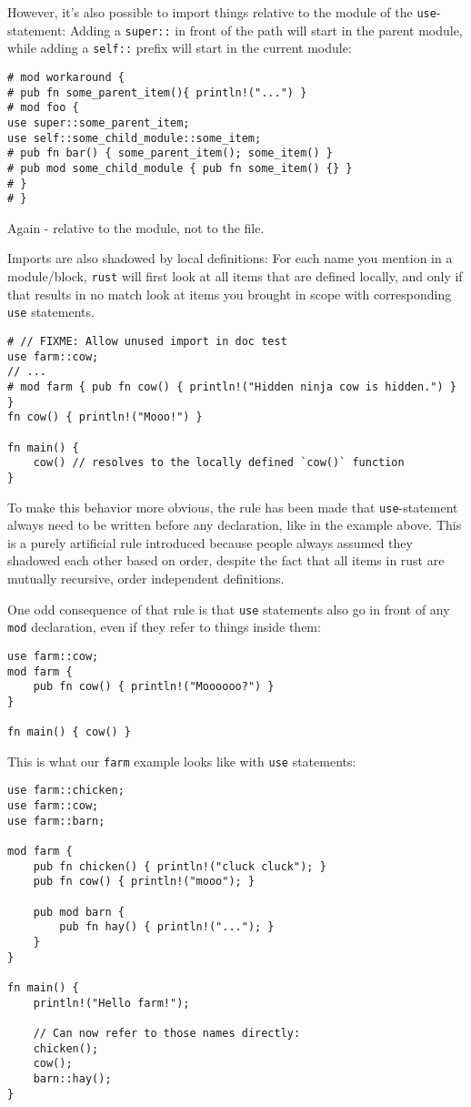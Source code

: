 \documentclass[]{article}
\begin{document}
However, it's also possible to import things relative to the module of
the \texttt{use}-statement: Adding a \texttt{super::} in front of the
path will start in the parent module, while adding a \texttt{self::}
prefix will start in the current module:

\begin{verbatim}
# mod workaround {
# pub fn some_parent_item(){ println!("...") }
# mod foo {
use super::some_parent_item;
use self::some_child_module::some_item;
# pub fn bar() { some_parent_item(); some_item() }
# pub mod some_child_module { pub fn some_item() {} }
# }
# }
\end{verbatim}

Again - relative to the module, not to the file.

Imports are also shadowed by local definitions: For each name you
mention in a module/block, \texttt{rust} will first look at all items
that are defined locally, and only if that results in no match look at
items you brought in scope with corresponding \texttt{use} statements.

\begin{verbatim}
# // FIXME: Allow unused import in doc test
use farm::cow;
// ...
# mod farm { pub fn cow() { println!("Hidden ninja cow is hidden.") } }
fn cow() { println!("Mooo!") }

fn main() {
    cow() // resolves to the locally defined `cow()` function
}
\end{verbatim}

To make this behavior more obvious, the rule has been made that
\texttt{use}-statement always need to be written before any declaration,
like in the example above. This is a purely artificial rule introduced
because people always assumed they shadowed each other based on order,
despite the fact that all items in rust are mutually recursive, order
independent definitions.

One odd consequence of that rule is that \texttt{use} statements also go
in front of any \texttt{mod} declaration, even if they refer to things
inside them:

\begin{verbatim}
use farm::cow;
mod farm {
    pub fn cow() { println!("Moooooo?") }
}

fn main() { cow() }
\end{verbatim}

This is what our \texttt{farm} example looks like with \texttt{use}
statements:

\begin{verbatim}
use farm::chicken;
use farm::cow;
use farm::barn;

mod farm {
    pub fn chicken() { println!("cluck cluck"); }
    pub fn cow() { println!("mooo"); }

    pub mod barn {
        pub fn hay() { println!("..."); }
    }
}

fn main() {
    println!("Hello farm!");

    // Can now refer to those names directly:
    chicken();
    cow();
    barn::hay();
}
\end{verbatim}
\end{document}
